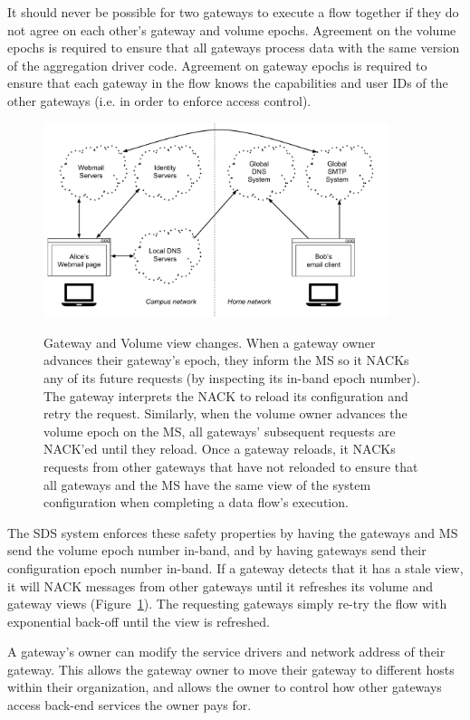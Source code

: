 It should never be possible for two gateways to execute a flow together if they
do not agree on each other's gateway and volume epochs.  Agreement on the volume
epochs is required to ensure that all gateways process data with the same version
of the aggregation driver code.  Agreement on gateway epochs is required to
ensure that each gateway in the flow knows the capabilities and user IDs of the
other gateways (i.e. in order to enforce access control).

\begin{figure}[h]
   \caption{Gateway and Volume view changes.  When a gateway owner advances
   their gateway's epoch, they inform the MS so it NACKs any of its future
   requests (by inspecting its in-band epoch number).  The gateway interprets
   the NACK to reload its configuration and retry the request.  Similarly, when
   the volume owner advances the volume epoch on the MS, all gateways'
   subsequent requests are NACK'ed until they reload.  Once a gateway reloads,
   it NACKs requests from other gateways that have not reloaded to ensure that
   all gateways and the MS have the same view of the system configuration
   when completing a data flow's execution.}
   \centering
   \includegraphics[width=0.9\textwidth,page=12]{figures/dissertation-figures}
   \label{fig:chap2-view-changes}
\end{figure}

The SDS system enforces these safety properties by having the gateways and MS
send the volume epoch number in-band, and by having gateways send their
configuration epoch number in-band.  If a gateway detects that it has a stale
view, it will NACK messages from other gateways until it refreshes its volume
and gateway views (Figure~\ref{fig:chap2-view-changes}).
The requesting gateways simply re-try the flow with
exponential back-off until the view is refreshed.

A gateway's owner can modify the service drivers and network address of their
gateway.  This allows the gateway owner to move their gateway to different hosts
within their organization, and allows the owner to control how other gateways
access back-end services the owner pays for.

